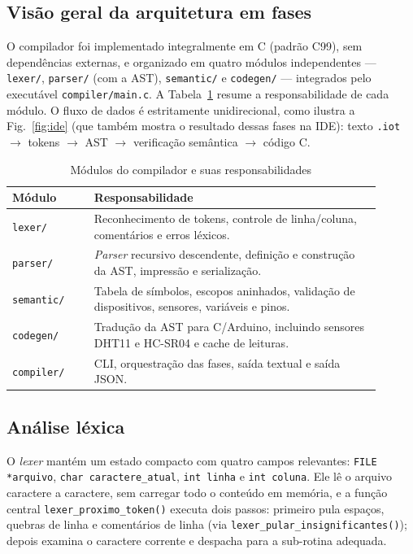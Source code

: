 \documentclass[conference]{IEEEtran}
\begin{document}
\subsection{Visão geral da arquitetura em fases}

O compilador foi implementado integralmente em C (padrão C99), sem
dependências externas, e organizado em quatro módulos independentes ---
\texttt{lexer/}, \texttt{parser/} (com a AST), \texttt{semantic/} e
\texttt{codegen/} --- integrados pelo executável \texttt{compiler/main.c}.
A Tabela~\ref{tab:modulos} resume a responsabilidade de cada módulo. O
fluxo de dados é estritamente unidirecional, como ilustra a
Fig.~\ref{fig:ide} (que também mostra o resultado dessas fases na IDE):
texto \texttt{.iot} $\rightarrow$ tokens $\rightarrow$ AST $\rightarrow$
verificação semântica $\rightarrow$ código C.

\begin{table}[htbp]
\caption{Módulos do compilador e suas responsabilidades}
\label{tab:modulos}
\centering
\begin{tabular}{p{0.20\linewidth}p{0.70\linewidth}}
\toprule
\textbf{Módulo} & \textbf{Responsabilidade} \\
\midrule
\texttt{lexer/} & Reconhecimento de tokens, controle de linha/coluna, comentários e erros léxicos. \\
\texttt{parser/} & \emph{Parser} recursivo descendente, definição e construção da AST, impressão e serialização. \\
\texttt{semantic/} & Tabela de símbolos, escopos aninhados, validação de dispositivos, sensores, variáveis e pinos. \\
\texttt{codegen/} & Tradução da AST para C/Arduino, incluindo sensores DHT11 e HC-SR04 e cache de leituras. \\
\texttt{compiler/} & CLI, orquestração das fases, saída textual e saída JSON. \\
\bottomrule
\end{tabular}
\end{table}

\subsection{Análise léxica}

O \emph{lexer} mantém um estado compacto com quatro campos relevantes:
\texttt{FILE *arquivo}, \texttt{char caractere\_atual}, \texttt{int linha}
e \texttt{int coluna}. Ele lê o arquivo caractere a caractere, sem carregar
todo o conteúdo em memória, e a função central
\texttt{lexer\_proximo\_token()} executa dois passos: primeiro pula
espaços, quebras de linha e comentários de linha (via
\texttt{lexer\_pular\_insignificantes()}); depois examina o caractere
corrente e despacha para a sub-rotina adequada.
\end{document}
